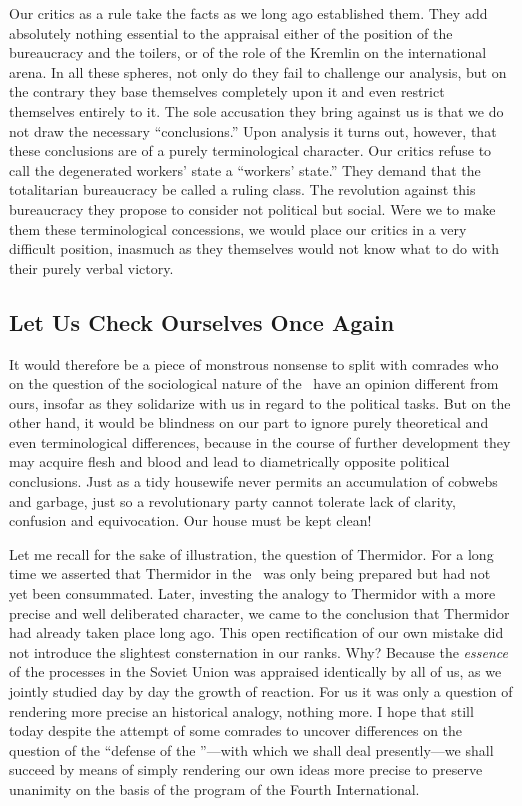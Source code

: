 Our critics as a rule take the facts as we long ago established them. They add absolutely nothing essential to the appraisal either of the position of the bureaucracy and the toilers, or of the role of the Kremlin on the international arena. In all these spheres, not only do they fail to challenge our analysis, but on the contrary they base themselves completely upon it and even restrict themselves entirely to it. The sole accusation they bring against us is that we do not draw the necessary “conclusions.” Upon analysis it turns out, however, that these conclusions are of a purely terminological character. Our critics refuse to call the degenerated workers’ state a ``workers’ state.'' They demand that the totalitarian bureaucracy be called a ruling class. The revolution against this bureaucracy they propose to consider not political but social. Were we to make them these terminological concessions, we would place our critics in a very difficult position, inasmuch as they themselves would not know what to do with their purely verbal victory.

\subsection*{Let Us Check Ourselves Once Again}

It would therefore be a piece of monstrous nonsense to split with comrades who on the question of the sociological nature of the \USSR\ have an opinion different from ours, insofar as they solidarize with us in regard to the political tasks. But on the other hand, it would be blindness on our part to ignore purely theoretical and even terminological differences, because in the course of further development they may acquire flesh and blood and lead to diametrically opposite political conclusions. Just as a tidy housewife never permits an accumulation of cobwebs and garbage, just so a revolutionary party cannot tolerate lack of clarity, confusion and equivocation. Our house must be kept clean!

Let me recall for the sake of illustration, the question of Thermidor. For a long time we asserted that Thermidor in the \USSR\ was only being prepared but had not yet been consummated. Later, investing the analogy to Thermidor with a more precise and well deliberated character, we came to the conclusion that Thermidor had already taken place long ago. This open rectification of our own mistake did not introduce the slightest consternation in our ranks. Why? Because the \emph{essence} of the processes in the Soviet Union was appraised identically by all of us, as we jointly studied day by day the growth of reaction. For us it was only a question of rendering more precise an historical analogy, nothing more. I hope that still today despite the attempt of some comrades to uncover differences on the question of the “defense of the \USSR”---with which we shall deal presently---we shall succeed by means of simply rendering our own ideas more precise to preserve unanimity on the basis of the program of the Fourth International.

